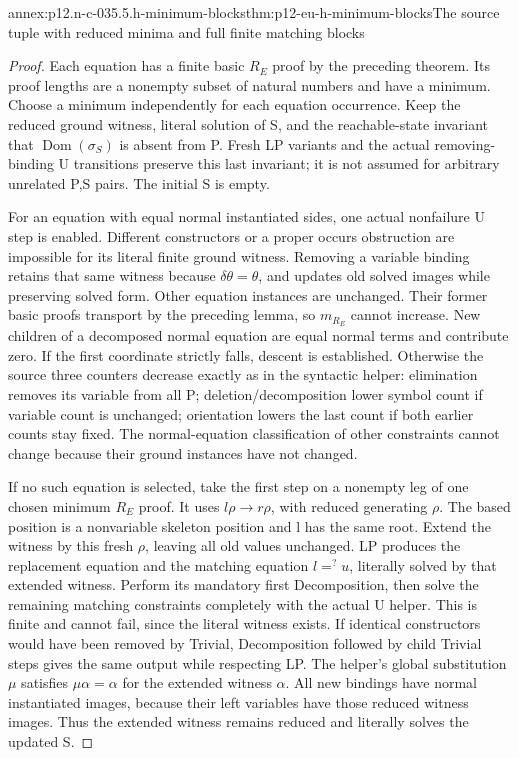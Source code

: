\begin{annexitem}{annex:p12.n-c-035.5.h-minimum-blocks}{thm:p12-eu-h-minimum-blocks}{The source tuple with reduced minima and full finite matching blocks}
\begin{proof}
Each equation has a finite basic \(R_E\) proof by the preceding
theorem. Its proof lengths are a nonempty subset of natural
numbers and have a minimum. Choose a minimum independently for
each equation occurrence. Keep the reduced ground witness,
literal solution of S, and the reachable-state invariant that
\(\operatorname{Dom}(\sigma_S)\) is absent from P. Fresh LP
variants and the actual removing-binding U transitions preserve
this last invariant; it is not assumed for arbitrary unrelated
P,S pairs. The initial S is empty.

For an equation with equal normal instantiated sides, one actual
nonfailure U step is enabled. Different constructors or a proper
occurs obstruction are impossible for its literal finite ground
witness. Removing a variable binding retains that same witness
because \(\delta\theta=\theta\), and updates old solved
images while preserving solved form. Other equation instances
are unchanged. Their former basic proofs transport by the
preceding lemma, so \(m_{R_E}\) cannot increase. New children
of a decomposed normal equation are equal normal terms and
contribute zero. If the first coordinate strictly falls, descent
is established. Otherwise the source three counters decrease
exactly as in the syntactic helper: elimination removes its
variable from all P; deletion/decomposition lower symbol count
if variable count is unchanged; orientation lowers the last
count if both earlier counts stay fixed. The normal-equation
classification of other constraints cannot change because their
ground instances have not changed.

If no such equation is selected, take the first step on a
nonempty leg of one chosen minimum \(R_E\) proof. It uses
\(l\rho\to r\rho\), with reduced generating \(\rho\).
The based position is a nonvariable skeleton position and l
has the same root. Extend the witness by this fresh \(\rho\),
leaving all old values unchanged. LP produces the replacement
equation and the matching equation \(l=^{?}u\), literally
solved by that extended witness. Perform its mandatory first
Decomposition, then solve the remaining matching constraints
completely with the actual U helper. This is finite and cannot
fail, since the literal witness exists. If identical constructors
would have been removed by Trivial, Decomposition followed by
child Trivial steps gives the same output while respecting LP.
The helper's global substitution \(\mu\) satisfies
\(\mu\alpha=\alpha\) for the extended witness \(\alpha\).
All new bindings have normal instantiated images, because their
left variables have those reduced witness images. Thus the
extended witness remains reduced and literally solves the updated S.


\end{proof}
\end{annexitem}
